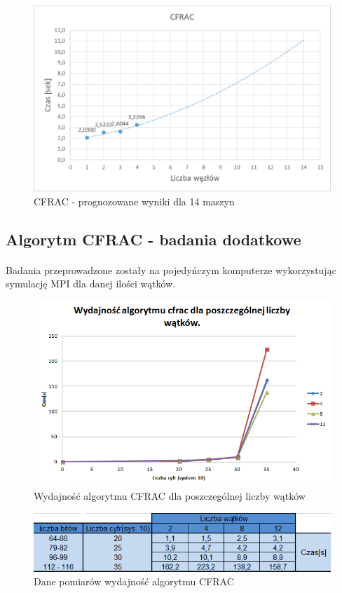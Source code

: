 \documentclass{article}
\begin{document}
\begin{figure}[h!]
    \includegraphics[width=\linewidth]{CFRAC_prognoza.png}
    \caption{CFRAC - prognozowane wyniki dla 14 maszyn}
    \label{fig:userpagescr}
\end{figure}

\clearpage
\subsection{Algorytm CFRAC - badania dodatkowe}
\paragraph{}Badania przeprowadzone zostały na pojedyńczym komputerze wykorzystując symulację MPI dla danej ilości wątków.
\begin{figure}[h]
    \centering
    \includegraphics[width=1.0\textwidth]{cfracWydajnosc.png}
    \caption{Wydajność algorytmu CFRAC dla poszczególnej liczby wątków}
    \label{fig:cfracWykres}
\end{figure}
\begin{figure}[h]
    \centering
    \includegraphics[width=1.0\textwidth]{cfracWydajnoscTabela.png}
    \caption{Dane pomiarów wydajność algorytmu CFRAC}
    \label{fig:cfracTabela}
\end{figure}
\end{document}
